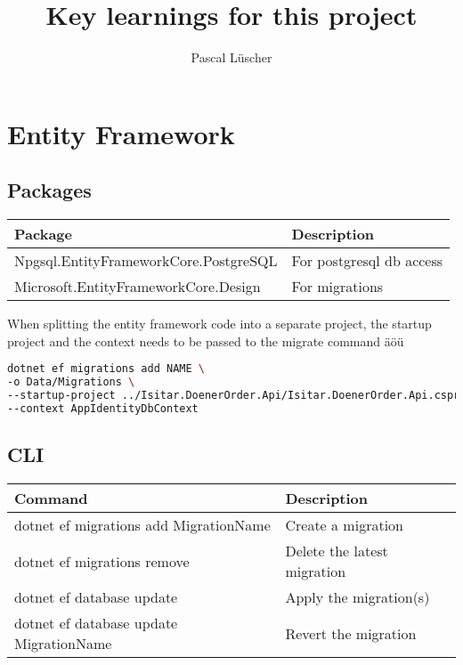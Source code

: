 \documentclass[12pt, a4paper]{article}
\begin{document}
\title{Key learnings for this project}
\author{Pascal Lüscher}

\maketitle
\thispagestyle{empty}
\tableofcontents{}

\section{Entity Framework}

\subsection{Packages}
\begin{table}
\centering
	\begin{tabular}{|l l|}
		\hline
		Package & Description \\
		\hline \hline
		Npgsql.EntityFrameworkCore.PostgreSQL & For postgresql db access \\
		
		Microsoft.EntityFrameworkCore.Design & For migrations \\
		\hline
	\end{tabular}
\end{table}

When splitting the entity framework code into a separate project, the startup project and the context needs to be passed to the migrate command äöü

\begin{lstlisting}[language=bash]
dotnet ef migrations add NAME \
-o Data/Migrations \
--startup-project ../Isitar.DoenerOrder.Api/Isitar.DoenerOrder.Api.csproj \
--context AppIdentityDbContext
\end{lstlisting}

\subsection{CLI}

\begin{table}
\centering
	\begin{tabular}{|l l|}
		\hline
		Command & Description \\
		\hline \hline
		dotnet ef migrations add MigrationName & Create a migration \\
		dotnet ef migrations remove & Delete the latest migration \\
		\hline
		dotnet ef database update & Apply the migration(s) \\
		dotnet ef database update MigrationName & Revert the migration \\
		\hline
	\end{tabular}
\end{table}
\end{document}
